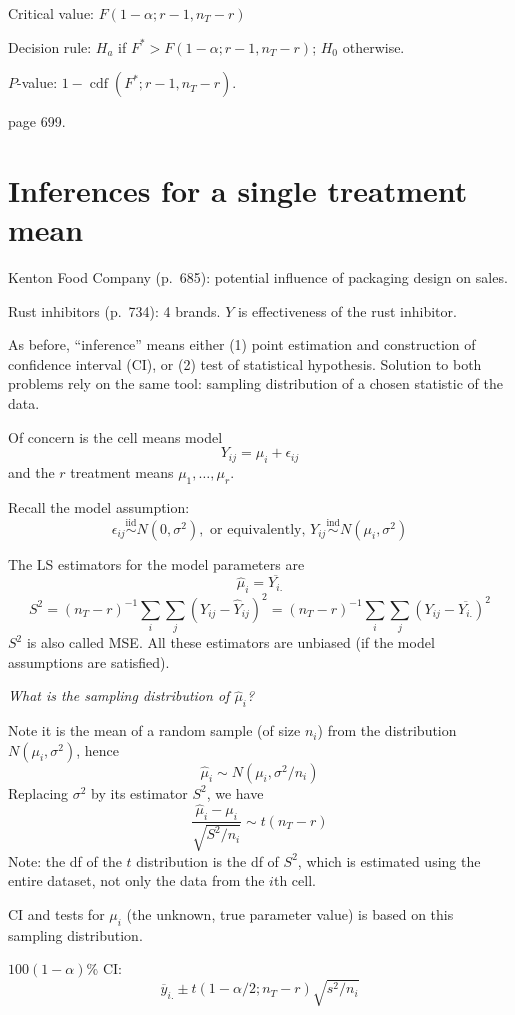 \documentclass[12pt]{article}
\begin{document}
Critical value: $F(1-\alpha; r-1, n_T - r)$

Decision rule: $H_a$ if $F^* > F(1-\alpha; r-1, n_T - r)$; $H_0$
otherwise.

$P$-value: $1 - \operatorname{cdf}(F^*; r-1, n_T-r)$.

\example
page 699.


\section{Inferences for a single treatment mean}

\example
Kenton Food Company (p.~685): potential influence of
packaging design on sales.

\example
Rust inhibitors (p.~734): 4 brands. $Y$ is effectiveness of the rust
inhibitor.


As before, ``inference'' means either
(1) point estimation and construction of confidence interval (CI),
or (2) test of statistical hypothesis.
Solution to both problems rely on the same tool:
sampling distribution of a chosen statistic of the data.

Of concern is the cell means model
\[
Y_{ij} = \mu_i + \epsilon_{ij}
\]
and the $r$ treatment means $\mu_1, \dotsc, \mu_r$.

Recall the model assumption:
\[
\epsilon_{ij} \overset{\text{iid}}{\sim} N(0, \sigma^2)
,\text{ or equivalently, }
Y_{ij} \overset{\text{ind}}{\sim} N(\mu_i, \sigma^2)
\]

The LS estimators for the model parameters are
\[
\hat{\mu}_i = \overline{Y_{i.}}
\]
\[
S^2
= (n_T-r)^{-1}\sum_i\sum_j (Y_{ij} - \hat{Y}_{ij})^2
= (n_T-r)^{-1}\sum_i\sum_j (Y_{ij} - \overline{Y_{i.}})^2
\]
$S^2$ is also called MSE.
All these estimators are unbiased
(if the model assumptions are satisfied).


\emph{What is the sampling distribution of $\hat{\mu}_i$?}

Note it is the mean of a random sample (of size $n_i$)
from the distribution $N(\mu_i, \sigma^2)$, hence
\[
\hat{\mu}_i \sim N(\mu_i, \sigma^2/n_i)
\]
Replacing $\sigma^2$ by its estimator $S^2$, we have
\[
\frac{\hat{\mu}_i - \mu_i}{\sqrt{S^2/n_i}} \sim t(n_T - r)
\]
Note: the df of the $t$ distribution is the df of $S^2$,
which is estimated using the entire dataset,
not only the data from the $i$th cell.

CI and tests for $\mu_i$ (the unknown, true parameter value) is based on
this sampling distribution.

$100(1-\alpha)\%$ CI:
\[
\overline{y}_{i.} \pm t(1-\alpha/2; n_T-r) \sqrt{s^2/n_i}
\]
\end{document}
